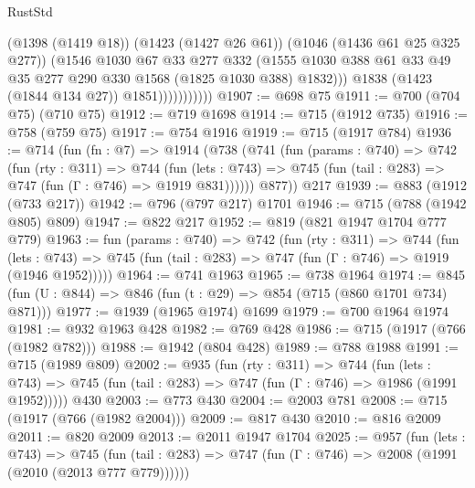 \begin{lexlean}{RustStd}
\begin{coremodule}
                            (@1398 (@1419 @18))
                            (@1423 (@1427 @26 @61))
                            (@1046 (@1436 @61 @25 @325 @277))
                            (@1546
                              @1030
                              @67
                              @33
                              @277
                              @332
                              (@1555
                                @1030
                                @388
                                @61
                                @33
                                @49
                                @35
                                @277
                                @290
                                @330
                                @1568
                                (@1825 @1030 @388)
                                @1832)))
                          @1838
                          (@1423 (@1844 @134 @27))
                          @1851)))))))))))
@1907 := @698 @75
@1911 := @700 (@704 @75) (@710 @75)
@1912 := @719 @1698
@1914 := @715 (@1912 @735)
@1916 := @758 (@759 @75)
@1917 := @754 @1916
@1919 := @715 (@1917 @784)
@1936 := @714
    (fun (fn : @7) =>
    @1914
      (@738
        (@741
          (fun (params : @740) =>
          @742
            (fun (rty : @311) =>
            @744
              (fun (lets : @743) =>
              @745 (fun (tail : @283) => @747 (fun (Γ : @746) => @1919 @831))))))
        @877))
    @217
@1939 := @883 (@1912 (@733 @217))
@1942 := @796 (@797 @217) @1701
@1946 := @715 (@788 (@1942 @805) @809)
@1947 := @822 @217
@1952 := @819 (@821 @1947 @1704 @777 @779)
@1963 := fun (params : @740) =>
  @742
    (fun (rty : @311) =>
    @744
      (fun (lets : @743) =>
      @745 (fun (tail : @283) => @747 (fun (Γ : @746) => @1919 (@1946 @1952)))))
@1964 := @741 @1963
@1965 := @738 @1964
@1974 := @845 (fun (U : @844) => @846 (fun (t : @29) => @854 (@715 (@860 @1701 @734) @871)))
@1977 := @1939 (@1965 @1974) @1699
@1979 := @700 @1964 @1974
@1981 := @932 @1963 @428
@1982 := @769 @428
@1986 := @715 (@1917 (@766 (@1982 @782)))
@1988 := @1942 (@804 @428)
@1989 := @788 @1988
@1991 := @715 (@1989 @809)
@2002 := @935
    (fun (rty : @311) =>
    @744
      (fun (lets : @743) =>
      @745 (fun (tail : @283) => @747 (fun (Γ : @746) => @1986 (@1991 @1952)))))
    @430
@2003 := @773 @430
@2004 := @2003 @781
@2008 := @715 (@1917 (@766 (@1982 @2004)))
@2009 := @817 @430
@2010 := @816 @2009
@2011 := @820 @2009
@2013 := @2011 @1947 @1704
@2025 := @957
    (fun (lets : @743) =>
    @745 (fun (tail : @283) => @747 (fun (Γ : @746) => @2008 (@1991 (@2010 (@2013 @777 @779))))))

\end{coremodule}
\end{lexlean}
